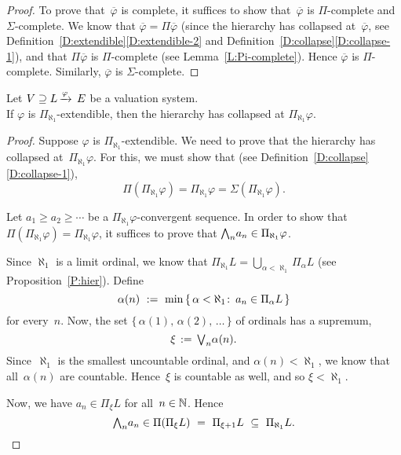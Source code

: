\documentclass[main.tex]{subfiles}
\begin{document}
\begin{proof}
To prove that~$\overline\varphi$ is complete,
it suffices to show that~$\overline\varphi$
is $\Pi$-complete and $\Sigma$-complete.
We know that $\overline\varphi = \Pi\overline\varphi$
(since the hierarchy has collapsed at~$\overline\varphi$,
see Definition~\ref{D:extendible}\ref{D:extendible-2}
and Definition~\ref{D:collapse}\ref{D:collapse-1}),
and that $\Pi\overline\varphi$ is $\Pi$-complete
(see Lemma~\ref{L:Pi-complete}).
Hence $\overline\varphi$ is $\Pi$-complete.
Similarly,
$\overline\varphi$ is $\Sigma$-complete.
\end{proof}
%
%
\begin{lem}
\label{L:aleph1}
Let $V \supseteq L\,\smash{\xrightarrow{\varphi}\,E}$ be a valuation system.\\
If $\varphi$ is $\Pi_{\aleph_1}$-extendible,
then the hierarchy has collapsed at $\Pi_{\aleph_1}\varphi$.
\end{lem}
\begin{proof}
Suppose $\varphi$ is $\Pi_{\aleph_1}$-extendible.
We need to prove that the hierarchy has collapsed at~$\Pi_{\aleph_1}\varphi$.
For this, we must show that
(see Definition~\ref{D:collapse}\ref{D:collapse-1}),
\begin{equation*}
\Pi(\Pi_{\aleph_1}\varphi)
= \Pi_{\aleph_1}\varphi = \Sigma(\Pi_{\aleph_1}\varphi).
\end{equation*}

Let $a_1 \geq a_2 \geq \dotsb$ 
be a $\Pi_{\aleph_1}\varphi$-convergent sequence.
In order to show that $\Pi(\Pi_{\aleph_1}\varphi)=\Pi_{\aleph_1}\varphi$,
it suffices to prove that $\textstyle{\bigwedge}_n a_n \in \Pi_{\aleph_1}\varphi$.

Since $\aleph_1$ is a limit ordinal,
we know that $\Pi_{\aleph_1} L = \bigcup_{\alpha < \aleph_1} \Pi_\alpha L$
(see Proposition~\ref{P:hier}).
Define
\begin{equation*}
\alpha(n)\ \eqdf\ 
\min\,\{\, \alpha<\aleph_1\colon\, a_n \in \Pi_\alpha L\,\}
\end{equation*}
for every~$n$.
Now,
the set $\{\,\alpha(1),\,\alpha(2),\,\dotsc\,\}$ of
ordinals has a supremum,
\begin{equation*}
\xi\,:=\,\textstyle{\bigvee}_n\alpha(n).
\end{equation*}
Since~$\aleph_1$ is the smallest uncountable ordinal,
and $\alpha(n)<\aleph_1$,
we know that all~$\alpha(n)$ are countable.
Hence~$\xi$ is countable as well,
and so $\xi<\aleph_1$.

Now, we have $a_n \in \Pi_{\xi} L$
for all~$n\in \mathbb{N}$.  Hence
\begin{equation*}
\textstyle{\bigwedge}_n a_n \in \Pi(\Pi_{\xi} L) 
\ =\ \Pi_{\xi+1} L
\ \subseteq\ \Pi_{\aleph_1} L.\qedhere
\end{equation*}
\end{proof}
\end{document}

